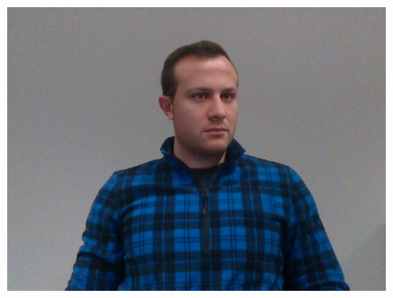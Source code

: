 \begin{figure}[h]
\begin{minipage}{.325\textwidth}
      \includegraphics[width=0.99\textwidth]{Figures/dataset/blended/4.png}
    \end{minipage}


\end{figure}
